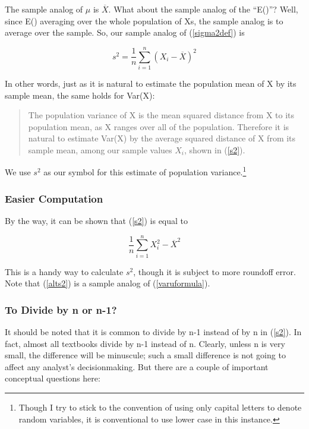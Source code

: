 The sample analog of $\mu$ is $\overline{X}$.  What about the sample
analog of the ``E()''?  Well, since E() averaging over the whole
population of Xs, the sample analog is to average over the sample.  So,
our sample analog of (\ref{sigma2def}) is

\begin{equation}
\label{s2}
s^2 = \frac{1}{n} \sum_{i=1}^{n} (X_i-\overline{X})^2 
\end{equation}

In other words, just as it is natural to estimate the population mean of
X by its sample mean, the same holds for Var(X):

\begin{quote}
The population variance of X is the mean squared distance from X to its
population mean, as X ranges over all of the population.  Therefore 
it is natural to estimate Var(X) by the average squared distance of X 
from its sample mean, among our sample values $X_i$, shown in 
(\ref{s2}).
\end{quote}


We use $s^2$ as our symbol for this estimate of population
variance.\footnote{Though I try to stick to the convention of using only
capital letters to denote random variables, it is conventional to use
lower case in this instance.} 

\subsubsection{Easier Computation}

By the way, it can be shown that (\ref{s2}) is equal to 

\begin{equation}
\label{alts2}
\frac{1}{n} \sum_{i=1}^{n} X_i^2 - \overline{X}^2
\end{equation}

This is a handy way to calculate $s^2$, though it is subject to more
roundoff error.  Note that (\ref{alts2}) is a sample analog of
(\ref{varuformula}).

\subsubsection{To Divide by n or n-1?}
\label{dividebywhat}

It should be noted that it is common to divide by n-1 instead of by n in
(\ref{s2}).  In fact, almost all textbooks divide by n-1 instead of n.
Clearly, unless n is very small, the difference will be minuscule; such
a small difference is not going to affect any analyst's decisionmaking.
But there are a couple of important conceptual questions here:

